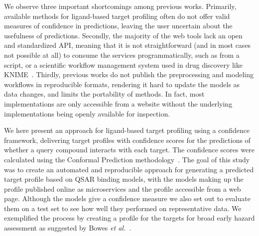 \documentclass[utf8]{frontiersSCNS} %
\begin{document}
We observe three important shortcomings among previous works. Primarily, available
methods for ligand-based target profiling often do not offer valid measures of
confidence in predictions, leaving the user uncertain about the usefulness of
predictions. Secondly, the majority of the web tools lack an open and
standardized API, meaning that it is not straightforward (and in most cases not
possible at all) to consume the services programmatically, such as from a
script, or a scientific workflow management system used in drug discovery like
KNIME~\cite{Mazanetz:2012gy}. Thirdly, previous works do not publish the preprocessing and modeling workflows in reproducible formats, rendering it hard to update the models as data changes, and limits the portability of methods. In fact, most implementations are only accessible from a website without the underlying implementations being openly available for inspection.

We here present an approach for ligand-based target profiling using a
confidence framework, delivering target profiles with confidence scores for the
predictions of whether a query compound interacts with each target. The
confidence scores were calculated using the Conformal Prediction
methodology~\cite{Vovk2005}.
%
The goal of this study was to create an automated and reproducible approach for
generating a predicted target profile based on QSAR binding models, with the models
making up the profile published online as microservices and the profile
accessible from a web page. Although the models give a confidence measure we
also set out to evaluate them on a test set to see how well they performed on
representative data. We exemplified the process by creating a profile for the
targets for broad early hazard assessment as suggested by Bowes \textit{et
al.}~\cite{Bowes2012}.
\end{document}
